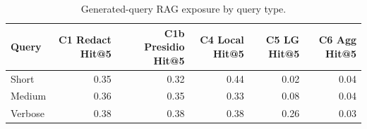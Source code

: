 \begin{table}[t]
\centering
\small
\setlength{\tabcolsep}{3pt}
\caption{Generated-query RAG exposure by query type.}
\label{tab:rag_query_sensitivity}
\begin{tabular}{lrrrrr}
\toprule
Query & C1 Redact Hit@5 & C1b Presidio Hit@5 & C4 Local Hit@5 & C5 LG Hit@5 & C6 Agg Hit@5 \\
\midrule
Short & 0.35 & 0.32 & 0.44 & 0.02 & 0.04 \\
Medium & 0.36 & 0.35 & 0.33 & 0.08 & 0.04 \\
Verbose & 0.38 & 0.38 & 0.38 & 0.26 & 0.03 \\
\bottomrule
\end{tabular}
\end{table}

